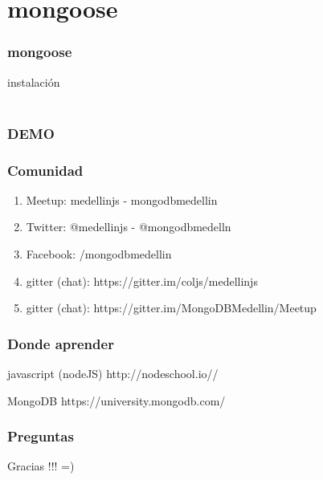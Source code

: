 \documentclass{beamer}
\begin{document}
\section{mongoose}
\begin{frame}
\frametitle{mongoose}
\pause
instalaci\'on
\\~\\

\end{frame}

\begin{frame}
\frametitle{DEMO}
\end{frame}

\begin{frame}
\frametitle{Comunidad}
\begin{enumerate}
\item Meetup: medellinjs  - mongodbmedellin
\pause
\item Twitter: @medellinjs - @mongodbmedelln
\pause
\item Facebook: /mongodbmedellin
\pause
\item gitter (chat): https://gitter.im/coljs/medellinjs
\pause
\item gitter (chat): https://gitter.im/MongoDBMedellin/Meetup
\end{enumerate}
\end{frame}
\begin{frame}
\frametitle{Donde aprender}
\footnotesize{
\begin{thebibliography}{99} %
 javascript (nodeJS)
\newblock http://nodeschool.io//
\end{thebibliography}
}

\footnotesize{
\begin{thebibliography}{99} %
 MongoDB
\newblock https://university.mongodb.com/
\end{thebibliography}
}
\end{frame}

\begin{frame}
\frametitle{Preguntas}
\end{frame}

\begin{frame}
\Huge{\centerline{Gracias !!! =)}}
\end{frame}
\end{document}

